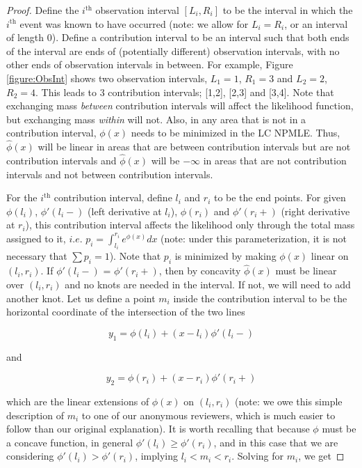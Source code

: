 	\begin{proof}

	Define the $i^{\text{th}}$ observation interval $[L_i, R_i]$ to be the interval in which the $i^{\text{th}}$ event was known to have occurred (note: we allow for $L_i = R_i$, or an interval of length 0). Define a contribution interval to be an interval such that both ends of the interval are ends of (potentially different) observation intervals, with no other ends of observation intervals in between. For example, Figure \ref{figure:ObsInt} shows two observation intervals, $L_1 = 1$, $R_1 = 3$ and $L_2 = 2$, $R_2 = 4$. This leads to 3 contribution intervals; [1,2], [2,3] and [3,4]. Note that exchanging mass \emph{between} contribution intervals will affect the likelihood function, but exchanging mass \emph{within} will not. Also, in any area that is not in a contribution interval, $\phi(x)$ needs to be minimized in the LC NPMLE. Thus, $\hat \phi(x)$ will be linear in areas that are between contribution intervals but are not contribution intervals and $\hat \phi(x)$ will be $-\infty$ in areas that are not contribution intervals and not between contribution intervals. 

	For the $i^{\text{th}}$ contribution interval, define $l_i$ and $r_i$ to be the end points. For given $\phi(l_i)$, $\phi'(l_i -)$ (left derivative at $l_i$), $\phi(r_i)$ and $\phi'(r_i+)$ (right derivative at $r_i$), this contribution interval affects the likelihood only through the total mass assigned to it, $i.e.$ $p_i = \int_{l_i}^{r_i} e^ {\phi(x)} dx$ (note: under this parameterization, it is not necessary that $\sum p_i = 1$). Note that $p_i$ is minimized by making $\phi(x)$ linear on $(l_i, r_i)$. If $\phi'(l_i - )$ = $\phi'(r_i + )$, then by concavity $\hat{\phi}(x)$ must be linear over $(l_i, r_i)$ and no knots are needed in the interval. If not, we will need to add another knot. Let us define a point $m_i$ inside the contribution interval to be the horizontal coordinate of the intersection of the two lines

	\[
	y_1 = \phi(l_i) + (x - l_i) \phi'(l_i-)
	\]	
	
	and 
	
	\[
	y_2 = \phi(r_i) + (x - r_i) \phi'(r_i+)
	\]
	
	which are the linear extensions of $\phi(x)$ on $(l_i, r_i)$ (note: we owe this simple description of $m_i$ to one of our anonymous reviewers, which is much easier to follow than our original explanation).  It is worth recalling that because $\phi$ must be a concave function, in general $\phi'(l_i) \ge \phi'(r_i)$, and in this case that we are considering $\phi'(l_i) > \phi'(r_i)$, implying $l_i < m_i < r_i$. Solving for $m_i$, we get 
	 	

\end{proof}
